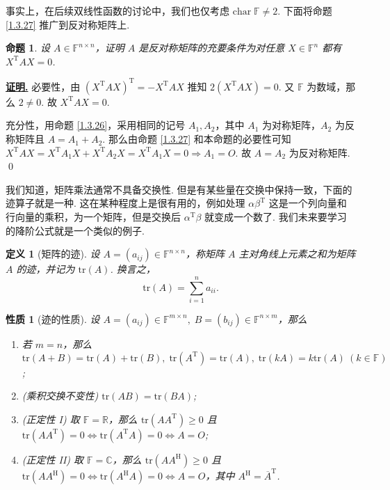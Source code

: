 \documentclass[10pt,openany]{article}
\theoremstyle{thmstyle} %
\theoremstyle{defstyle} %
\newtheorem{definition}[theorem]{定义}
\theoremstyle{prostyle} %
\newtheorem{proposition}[theorem]{命题}
\newtheorem{property}[theorem]{性质}
\theoremstyle{exastyle}
\theoremstyle{remstyle}
\renewenvironment{proof}[1][证明]{\par\underline{\textbf{#1.}} \;\fangsong}{\qed\par}
\newcommand{\T}{^{\text{T}}}
\newcommand{\Her}{^{\text{H}}}
\newcommand{\F}{\mathbb{F}}
\newcommand{\n}{^{n \times n}}
\newcommand{\tz}{\mathrm{char} \;}
\newcommand{\tr}{\mathrm{tr}}
\begin{document}
事实上，在后续双线性函数的讨论中，我们也仅考虑 \( \tz \F \neq 2 \). 下面将命题 \ref{1.3.27} 推广到反对称矩阵上.

\begin{proposition}
	设 \( A \in \F\n \)，证明 \( A \) 是反对称矩阵的充要条件为对任意 \( X \in \F^n \) 都有 \( X\T A X= 0 \).
\end{proposition}

\begin{proof}
	必要性，由 \( (X\T AX)\T= -X\T AX \) 推知 \( 2(X\T AX)=0 \). 又 \( \F \) 为数域，那么 \( 2 \neq 0 \). 故 \( X\T AX=0 \).
	
	充分性，用命题 \ref{1.3.26}，采用相同的记号 \( A_1,A_2 \)，其中 \( A_1 \) 为对称矩阵，\( A_2 \) 为反称矩阵且 \( A=A_1+A_2\). 那么由命题 \ref{1.3.27} 和本命题的必要性可知 \( X\T A X=X\T A_1 X+X\T A_2 X= X\T A_1 X=0 \Rightarrow A_1=O \). 故 \( A=A_2 \) 为反对称矩阵.
\end{proof}



我们知道，矩阵乘法通常不具备交换性. 但是有某些量在交换中保持一致，下面的迹算子就是一种. 这在某种程度上是很有用的，例如处理 \( \alpha\beta\T \) 这是一个列向量和行向量的乘积，为一个矩阵，但是交换后 \( \alpha\T\beta \) 就变成一个数了. 我们未来要学习的降阶公式就是一个类似的例子.

\begin{definition}[矩阵的迹]
	设 \( A=(a_{ij}) \in \F\n \)，称矩阵 \( A \) 主对角线上元素之和为矩阵 \( A \) 的迹，并记为 \( \tr(A) \). 换言之，
	\[ \tr(A)=\sum_{i=1}^{n} a_{ii}. \]
\end{definition}

\begin{property}[迹的性质]
	设 \( A=(a_{ij}) \in \F^{m \times n}, \; B=(b_{ij}) \in \F^{n \times m} \)，那么
	\begin{enumerate}[(1)]
		\item 若 \( m=n \)，那么 \( \tr(A+B)=\tr(A)+\tr(B), \; \tr(A\T)=\tr(A), \; \tr(kA)=k\tr(A) \ (k \in \F) \);
		\item (乘积交换不变性) \( \tr(AB)=\tr(BA) \);
		\item (正定性 I) 取 \( \F=\mathbb{R} \)，那么 \( \tr(AA\T) \geq 0 \) 且 \( \tr(AA\T)=0 \Leftrightarrow \tr(A\T A)=0 \Leftrightarrow A=O \);
		\item (正定性 II) 取 \( \F=\mathbb{C} \)，那么  \( \tr(AA\Her) \geq 0 \) 且  \( \tr(AA\Her)=0 \Leftrightarrow \tr(A\Her A)=0 \Leftrightarrow A=O \)，其中 \( A\Her= \overline{A}\T \).
	\end{enumerate}
\end{property}
\end{document}
